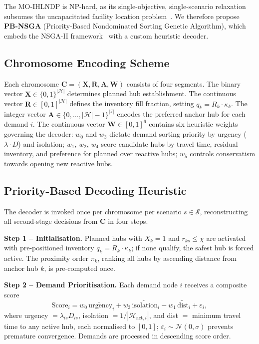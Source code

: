 \documentclass{llncs}
\begin{document}
The MO-IHLNDP is NP-hard, as its single-objective, single-scenario relaxation subsumes the uncapacitated facility location problem~\cite{mirchandani1990discrete}. 
We therefore propose \textbf{PB-NSGA} (Priority-Based Nondominated Sorting Genetic Algorithm), which embeds the NSGA-II framework~\cite{deb2002fast} with a custom heuristic decoder.

\subsection{Chromosome Encoding Scheme}

Each chromosome $\mathbf{C} = (\mathbf{X}, \mathbf{R}, \mathbf{A}, \mathbf{W})$ consists of four segments. The binary vector $\mathbf{X} \in \{0,1\}^{|\mathcal{H}|}$ determines planned hub establishment. The continuous vector $\mathbf{R} \in [0,1]^{|\mathcal{H}|}$ defines the inventory fill fraction, setting $q_k = R_k \cdot \kappa_k$. The integer vector $\mathbf{A} \in \{0,\ldots,|\mathcal{H}|-1\}^{|\mathcal{I}|}$ encodes the preferred anchor hub for each demand $i$. The continuous vector $\mathbf{W} \in [0,1]^6$ contains six heuristic weights governing the decoder: $w_0$ and $w_3$ dictate demand sorting priority by urgency ($\lambda \cdot D$) and isolation; $w_1$, $w_2$, $w_4$ score candidate hubs by travel time, residual inventory, and preference for planned over reactive hubs; $w_5$ controls conservatism towards opening new reactive hubs.

\subsection{Priority-Based Decoding Heuristic}
\label{sec:decoder}

The decoder is invoked once per chromosome per scenario $s \in \mathcal{S}$, reconstructing all second-stage decisions from $\mathbf{C}$ in four steps.

\textbf{Step 1 -- Initialisation.} Planned hubs with $X_k = 1$ and $r_{ks} \le \chi$ are activated with pre-positioned inventory $q_k = R_k \cdot \kappa_k$; if none qualify, the safest hub is forced active. The proximity order $\pi_k$, ranking all hubs by ascending distance from anchor hub $k$, is pre-computed once.

\textbf{Step 2 -- Demand Prioritisation.} Each demand node $i$ receives a composite score
\begin{equation}
    \text{Score}_i = w_0\,\widetilde{\text{urgency}}_i + w_3\,\widetilde{\text{isolation}}_i - w_1\,\widetilde{\text{dist}}_i + \varepsilon_i,
    \label{eq:demand_score}
\end{equation}
where urgency $= \lambda_{is}D_{is}$, isolation $= 1/|\mathcal{H}_{\text{act},i}|$, and dist $=$ minimum travel time to any active hub, each normalised to $[0,1]$; $\varepsilon_i \sim \mathcal{N}(0,\sigma)$ prevents premature convergence. Demands are processed in descending score order.
\end{document}
